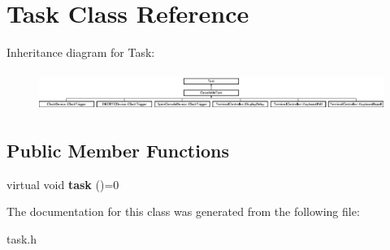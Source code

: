 \hypertarget{classTask}{
\section{Task Class Reference}
\label{classTask}
}
Inheritance diagram for Task:\begin{figure}[H]
\begin{center}
\leavevmode
\includegraphics[height=1.27273cm]{classTask}
\end{center}
\end{figure}
\subsection*{Public Member Functions}
\begin{DoxyCompactItemize}
\item 
\hypertarget{classTask_a87488fcdd09c9a0200913333fb6c9c32}{
virtual void {\bfseries task} ()=0}
\label{classTask_a87488fcdd09c9a0200913333fb6c9c32}

\end{DoxyCompactItemize}


The documentation for this class was generated from the following file:\begin{DoxyCompactItemize}
\item 
task.h\end{DoxyCompactItemize}
